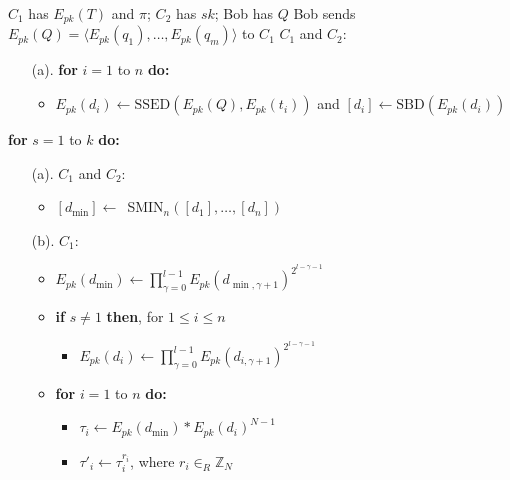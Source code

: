 \documentclass{article}
\begin{document}
\begin{algorithm}[!htbp]
\begin{algorithmic}[1]
\REQUIRE $C_1$ has $E_{pk}(T)$ and $\pi$; $C_2$ has $sk$; Bob has $Q$
\STATE  Bob sends $E_{pk}(Q) = \langle E_{pk}(q_1), \ldots, E_{pk}(q_m)\rangle $ to $C_1$
\STATE $C_1$ and $C_2$:
\begin{enumerate}\itemsep=-1pt
\item[(a).] \textbf{for} $i=1$ to $n$ \textbf{do:}
               \begin{itemize}
                      \item $E_{pk}(d_i) \gets \textrm{SSED}(E_{pk}(Q), E_{pk}(t_i))$ and $[d_i] \gets \textrm{SBD}(E_{pk}(d_i))$                      
               \end{itemize}         
\end{enumerate}
\STATE \textbf{for} $s=1$ to $k$ \textbf{do:}
\begin{enumerate}\itemsep=-1pt
    \item[(a).] $C_1$ and $C_2$:                            
              \begin{itemize}               
               \item $[d_{\min}] \gets$~SMIN$_n([d_1], \ldots, [d_n])$   
              \end{itemize}  
    \item[(b).] $C_1$:
              \begin{itemize}\itemsep=-1pt
                \item $E_{pk}(d_{\min}) \gets \prod_{\gamma=0}^{l-1} E_{pk}(d_{\min,\gamma+1})^{2^{l-\gamma -1}}$
                \item \textbf{if} $s \ne 1$ \textbf{then}, for $1 \le i \le n$
                \begin{itemize}       
                    \item $E_{pk}(d_i) \gets \prod_{\gamma=0}^{l-1} E_{pk}(d_{i,\gamma+1})^{2^{l -\gamma -1}}$  
                \end{itemize}      
                \item \textbf{for} $i=1$ to $n$ \textbf{do:}     
                \begin{itemize}\itemsep=0pt                                 
                    \item $\tau_i \gets E_{pk}(d_{\min})\ast E_{pk}(d_i)^{N-1}$
                    \item $\tau'_i \gets \tau_i^{r_i}$, where $r_i \in_R \mathbb{Z}_N$
                \end{itemize}  

\end{itemize}
\end{enumerate}
\end{algorithmic}
\end{algorithm}
\end{document}
